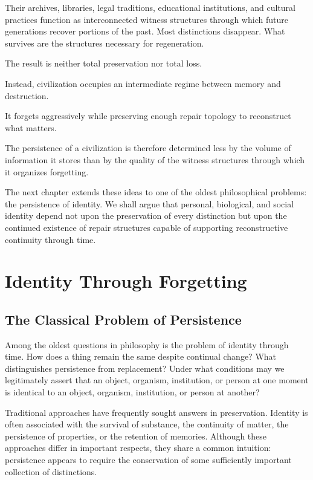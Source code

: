 \documentclass[12pt,oneside]{book}
\theoremstyle{plain} \newtheorem{theorem}{Theorem}[chapter] \newtheorem{lemma}[theorem]{Lemma} \newtheorem{proposition}[theorem]{Proposition} \newtheorem{corollary}[theorem]{Corollary}
\theoremstyle{definition} \newtheorem{definition}[theorem]{Definition} \newtheorem{axiom}[theorem]{Axiom} \newtheorem{construction}[theorem]{Construction}
\theoremstyle{remark} \newtheorem{remark}[theorem]{Remark} \newtheorem{example}[theorem]{Example}
\begin{document}
Their archives, libraries, legal traditions, educational institutions, and cultural practices function as interconnected witness structures through which future generations recover portions of the past. Most distinctions disappear. What survives are the structures necessary for regeneration.

The result is neither total preservation nor total loss.

Instead, civilization occupies an intermediate regime between memory and destruction.

It forgets aggressively while preserving enough repair topology to reconstruct what matters.

The persistence of a civilization is therefore determined less by the volume of information it stores than by the quality of the witness structures through which it organizes forgetting.

The next chapter extends these ideas to one of the oldest philosophical problems: the persistence of identity. We shall argue that personal, biological, and social identity depend not upon the preservation of every distinction but upon the continued existence of repair structures capable of supporting reconstructive continuity through time.

\chapter{Identity Through Forgetting}

\section{The Classical Problem of Persistence}

Among the oldest questions in philosophy is the problem of identity through time. How does a thing remain the same despite continual change? What distinguishes persistence from replacement? Under what conditions may we legitimately assert that an object, organism, institution, or person at one moment is identical to an object, organism, institution, or person at another?

Traditional approaches have frequently sought answers in preservation. Identity is often associated with the survival of substance, the continuity of matter, the persistence of properties, or the retention of memories. Although these approaches differ in important respects, they share a common intuition: persistence appears to require the conservation of some sufficiently important collection of distinctions.
\end{document}

